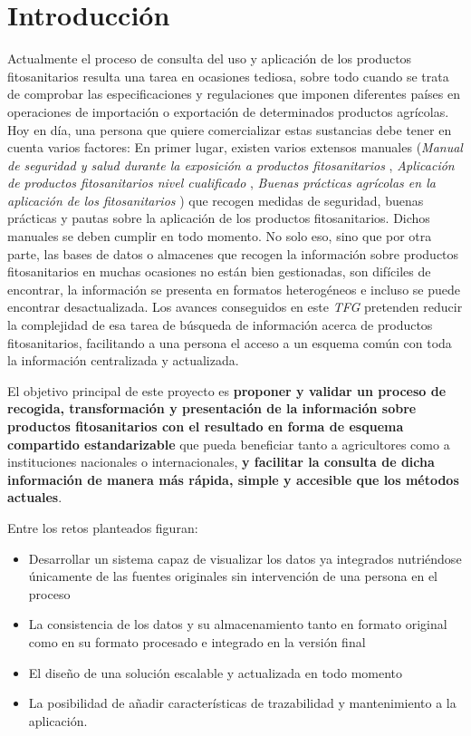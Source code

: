 \chapter{Introducción} \label{introduccion}
Actualmente el proceso de consulta del uso y aplicación de los productos fitosanitarios resulta una tarea en ocasiones tediosa, sobre todo cuando se trata de comprobar las especificaciones y regulaciones que imponen diferentes países en operaciones de importación o exportación de determinados productos agrícolas. Hoy en día, una persona que quiere comercializar estas sustancias debe tener en cuenta varios factores: En primer lugar, existen varios extensos manuales (\textit{Manual de seguridad y salud durante la exposición a productos fitosanitarios} \cite{manualseguridad}, \textit{Aplicación de productos fitosanitarios nivel cualificado} \cite{aplicacionfitosanitarios}, \textit{Buenas prácticas agrícolas en la aplicación de los fitosanitarios} \cite{buenaspracticas}) que recogen medidas de seguridad, buenas prácticas y pautas sobre la aplicación de los productos fitosanitarios. Dichos manuales se deben cumplir en todo momento. No solo eso, sino que por otra parte, las bases de datos o almacenes que recogen la información sobre productos fitosanitarios en muchas ocasiones no están bien gestionadas, son difíciles de encontrar, la información se presenta en formatos heterogéneos e incluso se puede encontrar desactualizada. Los avances conseguidos en este \textit{TFG} pretenden reducir la complejidad de esa tarea de búsqueda de información acerca de productos fitosanitarios, facilitando a una persona el acceso a un esquema común con toda la información centralizada y actualizada.\par

El objetivo principal de este proyecto es \textbf{proponer y validar un proceso de recogida, transformación y presentación de la información sobre productos fitosanitarios con el resultado en forma de esquema compartido estandarizable} que pueda beneficiar tanto a agricultores como a instituciones nacionales o internacionales, \textbf{y facilitar la consulta de dicha información de manera más rápida, simple y accesible que los métodos actuales}. \par
Entre los retos planteados figuran:
\begin{itemize}
\item Desarrollar un sistema capaz de visualizar los datos ya integrados nutriéndose únicamente de las fuentes originales sin intervención de una persona en el proceso
\item La consistencia de los datos y su almacenamiento tanto en formato original como en su formato procesado e integrado en la versión final
\item El diseño de una solución escalable y actualizada en todo momento
\item La posibilidad de añadir características de trazabilidad y mantenimiento a la aplicación.
\end{itemize}

